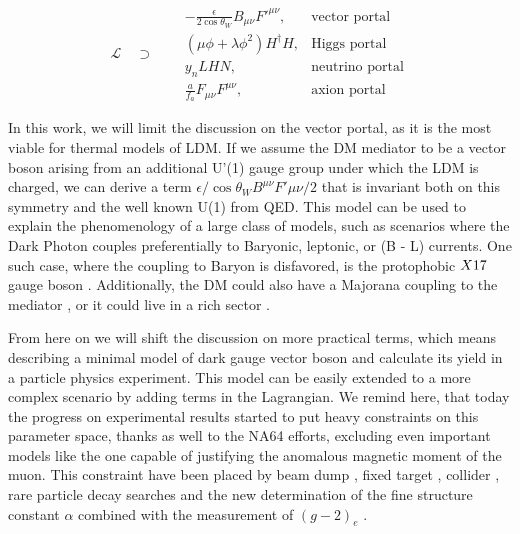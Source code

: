 \begin{equation}
  \label{eq:dm-portals}
  \mathcal{L} \quad \supset \quad
\begin{aligned}
  &-\frac{\epsilon}{2 \cos{\theta_W}}B_{\mu \nu}F'^{\mu \nu}, &\textrm{vector portal}\\
  & (\mu \phi + \lambda \phi^2)H^{\dagger}H, &\textrm{Higgs portal}\\
  &y_n LHN, &\textrm{neutrino portal} \\
  &\frac{a}{f_a} F_{\mu \nu} F^{\mu \nu}, &\textrm{axion portal}
\end{aligned}
\end{equation}

In this work, we will limit the discussion on the vector portal, as it is the most viable for thermal models of LDM. If we assume the DM mediator to be a vector boson arising from an additional U'(1) gauge group under which the LDM is charged, we can derive a term $\epsilon / \cos{\theta_W} B^{\mu \nu} F'{\mu \nu}/2$ that is invariant both on this symmetry and the well known U(1) from QED. This model can be used to explain the phenomenology of a large class of models, such as scenarios where the Dark Photon couples preferentially to Baryonic, leptonic, or (B - L) currents. One such case, where the coupling to Baryon is disfavored, is the protophobic $X17$ gauge boson \cite{PhysRevD.95.035017}. Additionally, the DM could also have a Majorana coupling to the mediator \cite{PhysRevD.93.063523}, or it could live in a rich sector \cite{Morrissey_2014}.

From here on we will shift the discussion on more practical terms, which means describing a minimal model of dark gauge vector boson and calculate its yield in a particle physics experiment. This model can be easily extended to a more complex scenario by adding terms in the Lagrangian. We remind here, that today the progress on experimental results started to put heavy constraints on this parameter space, thanks as well to the NA64 efforts, excluding even important models like the one capable of justifying the anomalous magnetic moment of the muon. This constraint have been placed by beam dump \cite{jdb, charm, rio, e137, konaka, bross, dav,  ath, nomad, e787, essig1, blum,sg1, blum1, sarah1}, fixed target \cite{apex,merkel,merkel1}, collider \cite{babar, curt, babar1}, rare particle decay searches \cite{sindrum, kloe, sg2, kloe2, wasa, hades, phenix, e949, na48, pol, kloe3} and the new determination of the fine structure constant $\alpha$ combined with the measurement of $(g-2)_e$ \cite{Parker191,PhysRevLett.100.120801}.

